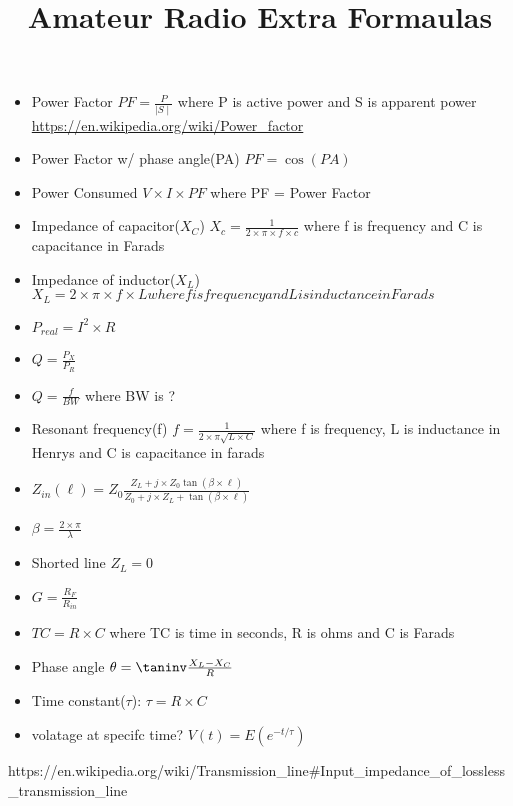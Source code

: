 \documentclass[14pt]{article}
\title{Amateur Radio Extra Formaulas}
\begin{document}
\begin{itemize}
  \item Power Factor $PF =\frac{P}{\mid{S}\mid}$ where P is active power and S is apparent power \url{https://en.wikipedia.org/wiki/Power_factor}
  \item Power Factor w/ phase angle(PA) $PF = \cos{(PA)}$
  \item Power Consumed $V \times I \times PF$ where PF = Power Factor
  \item Impedance of capacitor($X_{C}$) $X_{c} = \frac{1}{2 \times 
  \pi \times f \times c}$ where f is frequency and C is capacitance in Farads
  \item Impedance of inductor($X_{L}$)  $X_{L} = 2 \times \pi \times f \times L where f is frequency and L is inductance in Farads$
  \item $P_{real} = I^2 \times R$
  \item $Q = \frac{P_X}{P_R}$
  \item $Q = \frac {f}{BW}$ where BW is ?
  \item Resonant frequency(f)  $f = \frac{1}{2 \times \pi \sqrt{L \times C}}$ where f is frequency, L is inductance in Henrys and C is capacitance in farads
  \item $Z_{in}(\ell) = Z_0 \frac{Z_L + j \times Z_0 \tan{(\beta\times\ell)}}{ Z_0 + j \times Z_L + \tan{(\beta\times\ell)}}$
  \item $\beta = \frac{2\times\pi}{\lambda}$
  \item Shorted line $Z_L=0$ 
  \item $G = \frac{R_F}{R_{in}}$
  \item $TC = R \times C$ where TC is time in seconds, R is ohms and C is
  Farads
  \item Phase angle $\theta = \taninv\frac{X_L - X_C}{R}$
  \item Time constant($\tau$): $\tau = R \times C$
  \item volatage at specifc time? $V(t) = E(e^{-t/\tau})$
\end{itemize}
https://en.wikipedia.org/wiki/Transmission_line#Input_impedance_of_lossless_transmission_line
\end{document}
